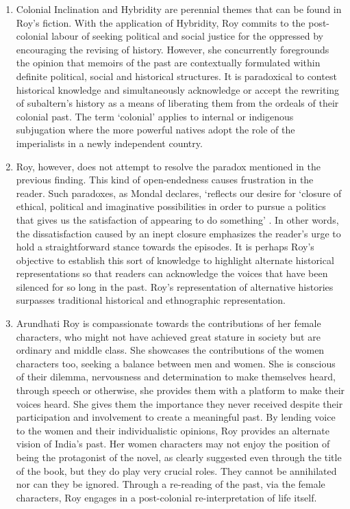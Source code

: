 \begin{enumerate}
  \item 	Colonial Inclination and Hybridity are perennial themes that can be found in Roy's fiction. With the application of Hybridity, Roy commits to the post-colonial labour of seeking political and social justice for the oppressed by encouraging the revising of history. However, she concurrently foregrounds the opinion that memoirs of the past are contextually formulated within definite political, social and historical structures. It is paradoxical to contest historical knowledge and simultaneously acknowledge or accept the rewriting of subaltern's history as a means of liberating them from the ordeals of their colonial past. The term `colonial' applies to internal or indigenous subjugation where the more powerful natives adopt the role of the imperialists in a newly independent country.

  \item Roy, however, does not attempt to resolve the paradox mentioned in the previous finding. This kind of open-endedness causes frustration in the reader. Such paradoxes, as Mondal declares, `reflects our desire for `closure of ethical, political and imaginative possibilities in order to pursue a politics that gives us the satisfaction of appearing to do something' \parencite{Mondal2013}. In other words, the dissatisfaction caused by an inept closure emphasizes the reader's urge to hold a straightforward stance towards the episodes. It is perhaps Roy's objective to establish this sort of knowledge to highlight alternate historical representations so that readers can acknowledge the voices that have been silenced for so long in the past. Roy's representation of alternative histories surpasses traditional historical and ethnographic representation.

  \item Arundhati Roy is compassionate towards the contributions of her female characters, who might not have achieved great stature in society but are ordinary and middle class. She showcases the contributions of the women characters too, seeking a balance between men and women. She is conscious of their dilemma, nervousness and determination to make themselves heard, through speech or otherwise, she provides them with a platform to make their voices heard. She gives them the importance they never received despite their participation and involvement to create a meaningful past. By lending voice to the women and their individualistic opinions, Roy provides an alternate vision of India's past. Her women characters may not enjoy the position of being the protagonist of the novel, as clearly suggested even through the title of the book, but they do play very crucial roles. They cannot be annihilated nor can they be ignored. Through a re-reading of the past, via the female characters, Roy engages in a post-colonial re-interpretation of life itself. 


\end{enumerate}
